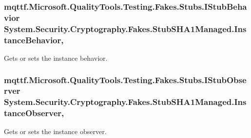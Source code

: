 \hypertarget{class_system_1_1_security_1_1_cryptography_1_1_fakes_1_1_stub_s_h_a1_managed_a15640e274ddd1ecbf7900218c99e34de}{
\subsubsection[{Instance\-Behavior}]{\setlength{\rightskip}{0pt plus 5cm}mqttf.\-Microsoft.\-Quality\-Tools.\-Testing.\-Fakes.\-Stubs.\-I\-Stub\-Behavior System.\-Security.\-Cryptography.\-Fakes.\-Stub\-S\-H\-A1\-Managed.\-Instance\-Behavior\hspace{0.3cm}{\ttfamily [get]}, {\ttfamily [set]}}}\label{class_system_1_1_security_1_1_cryptography_1_1_fakes_1_1_stub_s_h_a1_managed_a15640e274ddd1ecbf7900218c99e34de}


Gets or sets the instance behavior.

\hypertarget{class_system_1_1_security_1_1_cryptography_1_1_fakes_1_1_stub_s_h_a1_managed_a57cf06f33fe05c8ea0660946d08a4fed}{
\subsubsection[{Instance\-Observer}]{\setlength{\rightskip}{0pt plus 5cm}mqttf.\-Microsoft.\-Quality\-Tools.\-Testing.\-Fakes.\-Stubs.\-I\-Stub\-Observer System.\-Security.\-Cryptography.\-Fakes.\-Stub\-S\-H\-A1\-Managed.\-Instance\-Observer\hspace{0.3cm}{\ttfamily [get]}, {\ttfamily [set]}}}\label{class_system_1_1_security_1_1_cryptography_1_1_fakes_1_1_stub_s_h_a1_managed_a57cf06f33fe05c8ea0660946d08a4fed}


Gets or sets the instance observer.

